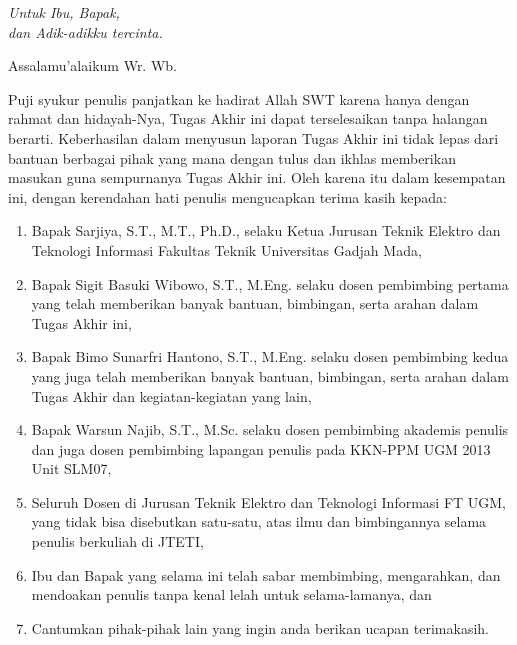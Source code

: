 \documentclass{jtetiskripsi}
\begin{document}
\cover

\approvalpage

\acknowledgment
\begin{flushright}
\emph{Untuk Ibu, Bapak,\\dan Adik-adikku tercinta.}
\end{flushright}

\preface
Assalamu'alaikum Wr. Wb.

\vspace{0.5cm}

Puji syukur penulis panjatkan ke hadirat Allah SWT karena hanya dengan rahmat dan hidayah-Nya, Tugas Akhir ini dapat terselesaikan tanpa halangan berarti. Keberhasilan dalam menyusun laporan Tugas Akhir ini tidak lepas dari bantuan berbagai pihak yang mana dengan tulus dan ikhlas memberikan masukan guna sempurnanya Tugas Akhir ini. Oleh karena itu dalam kesempatan ini, dengan kerendahan hati penulis mengucapkan terima kasih kepada:

\begin{enumerate}
\item{Bapak Sarjiya, S.T., M.T., Ph.D., selaku Ketua Jurusan Teknik Elektro dan Teknologi Informasi Fakultas Teknik Universitas Gadjah Mada,}
\item{Bapak Sigit Basuki Wibowo, S.T., M.Eng. selaku dosen pembimbing pertama yang telah memberikan banyak bantuan, bimbingan, serta arahan dalam Tugas Akhir ini,}
\item{Bapak Bimo Sunarfri Hantono, S.T., M.Eng. selaku dosen pembimbing kedua yang juga telah memberikan banyak bantuan, bimbingan, serta arahan dalam Tugas Akhir dan kegiatan-kegiatan yang lain,}
\item{Bapak Warsun Najib, S.T., M.Sc. selaku dosen pembimbing akademis penulis dan juga dosen pembimbing lapangan penulis pada KKN-PPM UGM 2013 Unit SLM07,}
\item{Seluruh Dosen di Jurusan Teknik Elektro dan Teknologi Informasi FT UGM, yang tidak bisa disebutkan satu-satu, atas ilmu dan bimbingannya selama penulis berkuliah di JTETI,}
\item{Ibu dan Bapak yang selama ini telah sabar membimbing, mengarahkan, dan mendoakan penulis tanpa kenal lelah untuk selama-lamanya, dan}
\item{Cantumkan pihak-pihak lain yang ingin anda berikan ucapan terimakasih.}
\end{enumerate}
\end{document}

